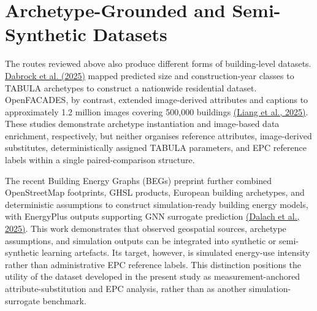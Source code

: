 \section{Archetype-Grounded and Semi-Synthetic Datasets}
\label{sec:2_6}


The routes reviewed above also produce different forms of building-level datasets. \hyperlink{ref:dabrock2025}{Dabrock et al. (2025)} mapped predicted size and construction-year classes to TABULA archetypes to construct a nationwide residential dataset. OpenFACADES, by contrast, extended image-derived attributes and captions to approximately 1.2 million images covering 500,000 buildings \hyperlink{ref:liang2025}{(Liang et al., 2025)}. These studies demonstrate archetype instantiation and image-based data enrichment, respectively, but neither organises reference attributes, image-derived substitutes, deterministically assigned TABULA parameters, and EPC reference labels within a single paired-comparison structure.


The recent Building Energy Graphs (BEGs) preprint further combined OpenStreetMap footprints, GHSL products, European building archetypes, and deterministic assumptions to construct simulation-ready building energy models, with EnergyPlus outputs supporting GNN surrogate prediction \hyperlink{ref:dalach2025}{(Dalach et al., 2025)}. This work demonstrates that observed geospatial sources, archetype assumptions, and simulation outputs can be integrated into synthetic or semi-synthetic learning artefacts. Its target, however, is simulated energy-use intensity rather than administrative EPC reference labels. This distinction positions the utility of the dataset developed in the present study as measurement-anchored attribute-substitution and EPC analysis, rather than as another simulation-surrogate benchmark.
